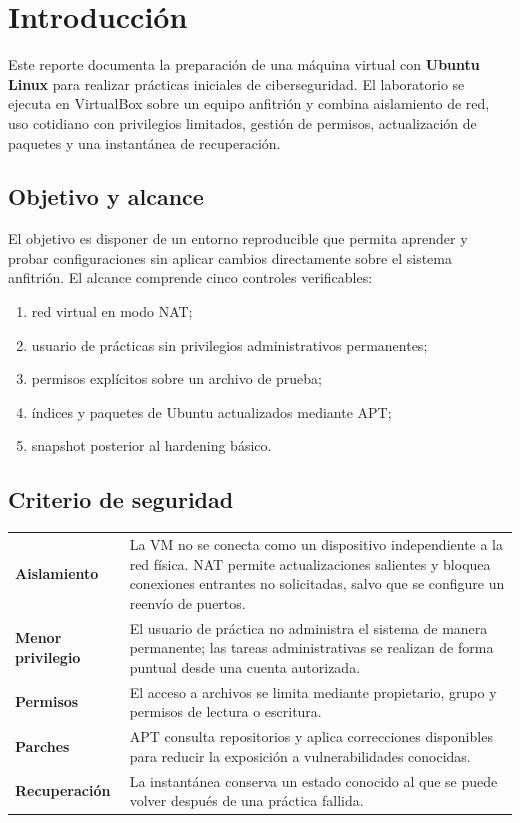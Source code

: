 \documentclass[11pt,a4paper]{article}
\begin{document}
\newpage
\section*{Introducción}
\leavevmode\par

Este reporte documenta la preparación de una máquina virtual con \textbf{Ubuntu Linux} para realizar prácticas iniciales de ciberseguridad. El laboratorio se ejecuta en VirtualBox sobre un equipo anfitrión y combina aislamiento de red, uso cotidiano con privilegios limitados, gestión de permisos, actualización de paquetes y una instantánea de recuperación.

\subsection*{Objetivo y alcance}

El objetivo es disponer de un entorno reproducible que permita aprender y probar configuraciones sin aplicar cambios directamente sobre el sistema anfitrión. El alcance comprende cinco controles verificables:

\begin{enumerate}
  \item red virtual en modo NAT;
  \item usuario de prácticas sin privilegios administrativos permanentes;
  \item permisos explícitos sobre un archivo de prueba;
  \item índices y paquetes de Ubuntu actualizados mediante APT;
  \item snapshot posterior al hardening básico.
\end{enumerate}

\subsection*{Criterio de seguridad}

\begin{tabularx}{\textwidth}{>{\raggedright\arraybackslash\bfseries\color{azul}}p{3.4cm} >{\raggedright\arraybackslash}X}
  Aislamiento & La VM no se conecta como un dispositivo independiente a la red física. NAT permite actualizaciones salientes y bloquea conexiones entrantes no solicitadas, salvo que se configure un reenvío de puertos.\\
  Menor privilegio & El usuario de práctica no administra el sistema de manera permanente; las tareas administrativas se realizan de forma puntual desde una cuenta autorizada.\\
  Permisos & El acceso a archivos se limita mediante propietario, grupo y permisos de lectura o escritura.\\
  Parches & APT consulta repositorios y aplica correcciones disponibles para reducir la exposición a vulnerabilidades conocidas.\\
  Recuperación & La instantánea conserva un estado conocido al que se puede volver después de una práctica fallida.\\
\end{tabularx}
\end{document}
